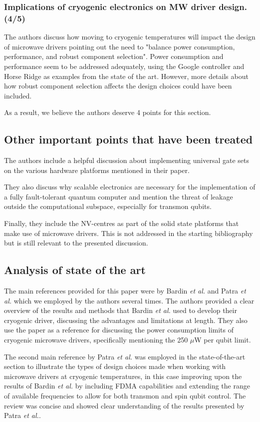 \documentclass[11pt]{article}
\begin{document}
\subsubsection{Implications of cryogenic electronics on MW driver design. (4/5)}
\label{sec:org9dd003e}
The authors discuss how moving to cryogenic temperatures will
impact the design of microwave drivers pointing out the need
to "balance power consumption, performance, and robust component
selection". Power consumption and performance seem to be addressed
adequately, using the Google controller and Horse Ridge as
examples from the state of the art. However, more details about
how robust component selection affects the design choices could
have been included.

As a result, we believe the authors deserve 4 points for this section.

\subsection{Other important points that have been treated}
\label{sec:org90c8a12}
The authors include a helpful discussion about implementing universal
gate sets on the various hardware platforms mentioned in their paper.

They also discuss why scalable electronics are necessary for the
implementation of a fully fault-tolerant quantum computer and mention
the threat of leakage outside the computational subspace, especially
for transmon qubits.

Finally, they include the NV-centres as part of the solid state platforms that
make use of microwave drivers. This is not addressed in the starting
bibliography but is still relevant to the presented discussion.

\subsection{Analysis of state of the art}
\label{sec:org43b4637}
The main references provided for this paper were by Bardin \emph{et al.} and
Patra \emph{et al.} which we employed by the authors several times. The
authors provided a clear overview of the results and methods that
Bardin \emph{et al.} used to develop their cryogenic driver, discussing the
advantages and limitations at length. They also use the paper as a
reference for discussing the power consumption limits of cryogenic
microwave drivers, specifically mentioning the 250 $ \mu $W per qubit limit.

The second main reference by Patra \emph{et al.} was employed in the
state-of-the-art section to illustrate the types of design choices made when
working with microwave drivers at cryogenic temperatures, in this case improving
upon the results of Bardin \emph{et al.} by including FDMA capabilities and
extending the range of available frequencies to allow for both transmon and spin
qubit control. The review was concise and showed clear understanding of the
results presented by Patra \emph{et al.}.
\end{document}
